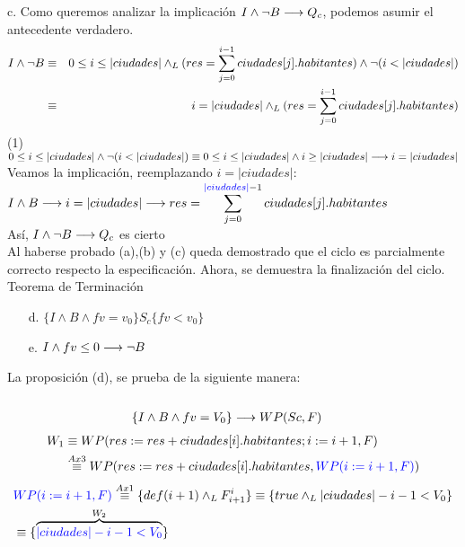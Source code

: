 \documentclass[10pt,a4paper,fleqn]{article}
\begin{document}
\item c. Como queremos analizar la implicación $I \land \neg B \longrightarrow Q_c$, podemos asumir el antecedente verdadero. 
\begin{eqnarray}
    I \land \neg B &\equiv& 0 \leq i \leq |ciudades| \yLuego (res = \small \displaystyle \sum_{j=0}^{i-1} ciudades[j].habitantes) \land \neg(i<|ciudades|) \\
    &\equiv& i=|ciudades| \yLuego (res = \small \displaystyle \sum_{j=0}^{i-1} ciudades[j].habitantes) \notag 
\end{eqnarray}
 (1) $0 \leq i \leq |ciudades| \land \neg(i<|ciudades|)\equiv 0 \leq i \leq |ciudades| \land i\geq |ciudades| \implica i = |ciudades|$\\
 
 Veamos la implicación, reemplazando $i = |ciudades|$:\\
$ I \land B \longrightarrow i = |ciudades| \longrightarrow res = \small \displaystyle \sum_{j=0}^{\textcolor{blue}{|ciudades|}-1} ciudades[j].habitantes$\\
Así, $I \land \neg B \longrightarrow Q_c$ es cierto\\ 
Al haberse probado (a),(b) y (c) queda demostrado que el ciclo es parcialmente correcto respecto la especificación. Ahora, se demuestra la finalización del ciclo.\\
\newpage
Teorema de Terminación
\begin{itemize}
    \item[d.] $\{I \land B \land fv = v_0\}S_c \{fv<v_0\}$ 
    \item[e.] $I \land fv \leq 0 \longrightarrow \neg B$
\end{itemize}
\indent
La proposición (d), se prueba de la siguiente manera: \\
\small {}  \\
\small {} 
\begin{align*}
    &\{I \land B \land fv = V_{0} \}\longrightarrow WP(Sc, F) 
\end{align*}
\begin{align*}
	W_{1} &\equiv WP(res := res + ciudades[i].habitantes ; i := i+1 , F)  \\ 
    &\overset{Ax3}{\equiv} WP(res := res + ciudades[i].habitantes, \textcolor{blue}{WP(i := i+1, F)}) 
\end{align*}
\begin{align*}
	& \textcolor{blue}{WP(i := i+1, F)} \overset{Ax1}{\equiv} \{ def(i+1) \land _L F_{i+1}^{i} \} \equiv \{ true \land _L |ciudades| - i - 1 < V_{0} \}  \\
    &\equiv \{\overbrace{\textcolor{blue}{|ciudades| - i - 1 < V_{0}}}^{W_2}\} 
\end{align*}
\end{document}
